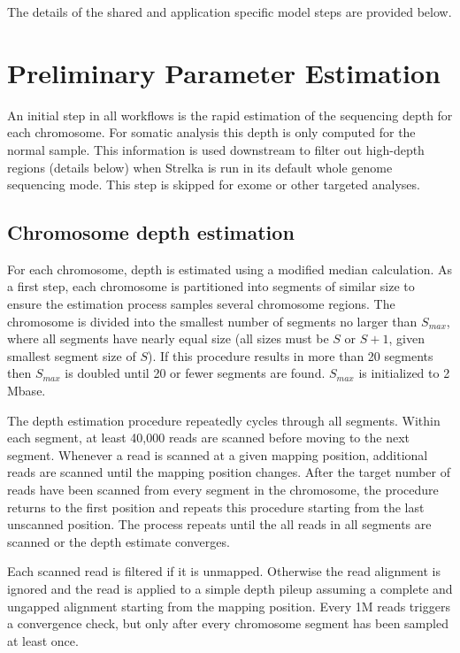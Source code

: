 \documentclass{article}
\begin{document}
The details of the shared and application specific model steps are provided below.



\section{Preliminary Parameter Estimation}

An initial step in all workflows is the rapid estimation of the sequencing depth for each chromosome. For somatic analysis this depth is only computed for the normal sample. This information is used downstream to filter out high-depth regions (details below) when Strelka is run in its default whole genome sequencing mode. This step is skipped for exome or other targeted analyses.


\subsection{Chromosome depth estimation}
\label{sec:depth_est}

For each chromosome, depth is estimated using a modified median calculation. As a first step, each chromosome is partitioned into segments of similar size to ensure the estimation process samples several chromosome regions. The chromosome is divided into the smallest number of segments no larger than $S_{max}$, where all segments have nearly equal size (all sizes must be $S$ or $S+1$, given smallest segment size of $S$). If this procedure results in more than 20 segments then $S_{max}$ is doubled until 20 or fewer segments are found. $S_{max}$ is initialized to 2 Mbase.

The depth estimation procedure repeatedly cycles through all segments. Within each segment, at least 40,000 reads are scanned before moving to the next segment. Whenever a read is scanned at a given mapping position, additional reads are scanned until the mapping position changes. After the target number of reads have been scanned from every segment in the chromosome, the procedure returns to the first position and repeats this procedure starting from the last unscanned position. The process repeats until the all reads in all segments are scanned or the depth estimate converges.

Each scanned read is filtered if it is unmapped. Otherwise the read alignment is ignored and the read is applied to a simple depth pileup assuming a complete and ungapped alignment starting from the mapping position. Every 1M reads triggers a convergence check, but only after every chromosome segment has been sampled at least once.
\end{document}
